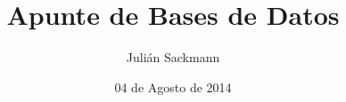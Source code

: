 \documentclass[]{article}
\title{Apunte de Bases de Datos}
\author{ Julián Sackmann }
\date{04 de Agosto de 2014}
\begin{document}
\ifpdf
{}
\else
{}
\fi

\setcounter{tocdepth}{4}

\newcommand{\de}[2]{\item \textbf{#1}: #2}
\newcommand{\ig}[2]{
\begin{center}
	\texttt{[image: images/\#2]}
\end{center}}
\newcommand{\subsubsubsection}[1]{\paragraph{#1}~\newline
 \indent }
\newcommand{\subsubsubsubsection}[1]{\subparagraph{#1}~\newline}
\newcommand{\partir}[4]{
\begin{minipage}[b]{#1\linewidth}\centering\begin{center}#3\end{center}\end{minipage}\begin{minipage}[b]{#2\linewidth}\centering\begin{center}#4\end{center}\end{minipage}
}
\newcommand{\flecha}[1]{\xrightarrow{\hspace*{0.3cm} #1 \hspace*{0.3cm}}}
\newcommand{\Flecha}[1]{\xRightarrow{\hspace*{0.3cm} #1 \hspace*{0.3cm}}}
\newcommand{\caja}[2]{\begin{center}
	\fbox{
		\parbox{#1\linewidth}{
			#2
		}
	}
\end{center}}
\renewcommand\contentsname{Índice}
\end{document}
